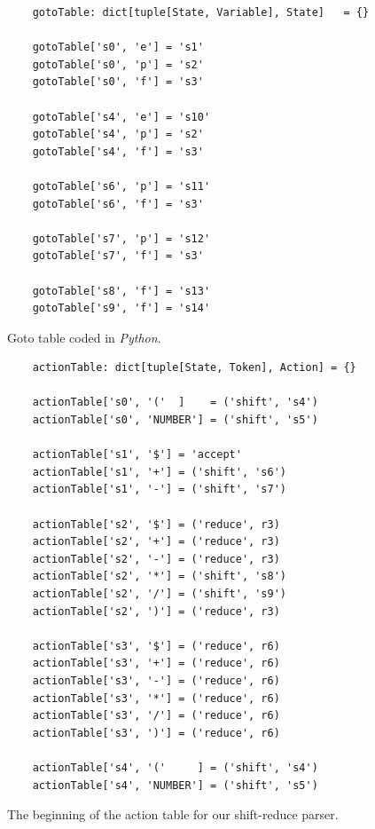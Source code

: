 \begin{figure}[!ht]
\centering
\begin{verbatim}
    gotoTable: dict[tuple[State, Variable], State]   = {}

    gotoTable['s0', 'e'] = 's1'
    gotoTable['s0', 'p'] = 's2'
    gotoTable['s0', 'f'] = 's3'

    gotoTable['s4', 'e'] = 's10'
    gotoTable['s4', 'p'] = 's2'
    gotoTable['s4', 'f'] = 's3'

    gotoTable['s6', 'p'] = 's11'
    gotoTable['s6', 'f'] = 's3'

    gotoTable['s7', 'p'] = 's12'
    gotoTable['s7', 'f'] = 's3'

    gotoTable['s8', 'f'] = 's13'
    gotoTable['s9', 'f'] = 's14'
\end{verbatim}
\vspace*{-0.3cm}
\caption{Goto table coded in \textsl{Python}.}
\label{fig:03-Parse-Table.ipynb:goto}
\end{figure}


\begin{figure}[!ht]
\centering
\begin{verbatim}
    actionTable: dict[tuple[State, Token], Action] = {}

    actionTable['s0', '('  ]    = ('shift', 's4')
    actionTable['s0', 'NUMBER'] = ('shift', 's5')

    actionTable['s1', '$'] = 'accept'
    actionTable['s1', '+'] = ('shift', 's6')
    actionTable['s1', '-'] = ('shift', 's7')

    actionTable['s2', '$'] = ('reduce', r3)
    actionTable['s2', '+'] = ('reduce', r3)
    actionTable['s2', '-'] = ('reduce', r3)
    actionTable['s2', '*'] = ('shift', 's8')
    actionTable['s2', '/'] = ('shift', 's9')
    actionTable['s2', ')'] = ('reduce', r3)

    actionTable['s3', '$'] = ('reduce', r6)
    actionTable['s3', '+'] = ('reduce', r6)
    actionTable['s3', '-'] = ('reduce', r6)
    actionTable['s3', '*'] = ('reduce', r6)
    actionTable['s3', '/'] = ('reduce', r6)
    actionTable['s3', ')'] = ('reduce', r6)

    actionTable['s4', '('     ] = ('shift', 's4')
    actionTable['s4', 'NUMBER'] = ('shift', 's5')
\end{verbatim}
\vspace*{-0.3cm}
\caption{The beginning of the action table for our shift-reduce parser.}
\label{fig:03-Parse-Table.ipynb:action}
\end{figure}

 
